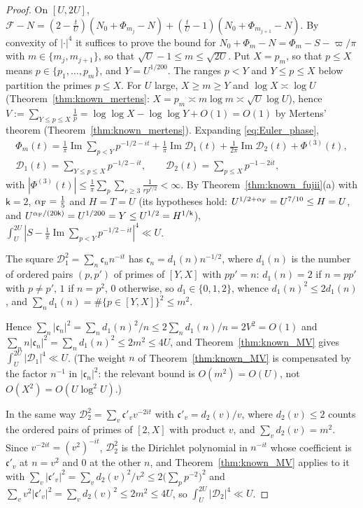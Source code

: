 \documentclass[11pt,a4paper]{article}
\makeatletter
\numberwithin{equation}{section}
\DeclareRobustCommand{\CGref}[1]{\ref{#1}}
\DeclareRobustCommand{\CGeqref}[1]{\eqref{#1}}
\let\CG@origref\ref
\let\CG@origeqref\eqref
\newcommand{\CG@gettip}[1]{\@ifundefined{CGTip@#1}{#1}{\csname CGTip@#1\endcsname}}
\DeclareRobustCommand{\CGref}[1]{\pdftooltip{\CG@origref{#1}}{\CG@gettip{#1}}}
\DeclareRobustCommand{\CGeqref}[1]{\pdftooltip{\CG@origeqref{#1}}{\CG@gettip{#1}}}
\theoremstyle{definition}
\theoremstyle{remark}
\newcommand{\Nz}{N_0} %
\newcommand{\Fc}{\mathcal F}
\newcommand{\Ph}{\Phi}
\makeatother
\begin{document}
\begin{proof}
On $[U,2U]$, $\Fc-N=(2-\frac tU)(\Nz+\Ph_{m_j}-N)+(\frac tU-1)(\Nz+\Ph_{m_{j+1}}-N)$. By convexity of $|\cdot|^4$ it suffices to prove the bound for $\Nz+\Ph_m-N=\Ph_m-S-\varpi/\pi$ with $m\in\{m_j,m_{j+1}\}$, so that $\sqrt U-1\le m\le\sqrt{2U}$. Put $X=p_m$, so that $p\le X$ means $p\in\{p_1,\dots,p_m\}$, and $Y=U^{1/200}$. The ranges $p<Y$ and $Y\le p\le X$ below partition the primes $p\le X$. For $U$ large, $X\ge m\ge Y$ and $\log X\asymp\log U$ (Theorem~\CGref{thm:known_mertens}: $X=p_m\asymp m\log m\asymp\sqrt U\log U$), hence $V:=\sum_{Y\le p\le X}\frac1p=\log\log X-\log\log Y+O(1)=O(1)$ by Mertens' theorem (Theorem~\CGref{thm:known_mertens}). Expanding \CGeqref{eq:Euler_phase},
\begin{equation}
\begin{gathered}
\Ph_m(t)=\frac1\pi\operatorname{Im}\sum_{p<Y}p^{-1/2-it}+\frac1\pi\operatorname{Im}\mathscr D_1(t)+\frac1{2\pi}\operatorname{Im}\mathscr D_2(t)+\Ph^{(3)}(t),\\
\mathscr D_1(t)=\sum_{Y\le p\le X}p^{-1/2-it},\qquad \mathscr D_2(t)=\sum_{p\le X}p^{-1-2it},
\end{gathered}
\label{eq:phase_split}
\end{equation}
with $|\Ph^{(3)}(t)|\le\frac1\pi\sum_p\sum_{r\ge3}\frac1{rp^{r/2}}<\infty$. By Theorem~\CGref{thm:known_fujii}(a) with $\mathsf k=2$, $\alpha_{\rm F}=\frac15$ and $H=T=U$ (its hypotheses hold: $U^{1/2+\alpha_{\rm F}}=U^{7/10}\le H=U$, and $U^{\alpha_{\rm F}/(20\mathsf k)}=U^{1/200}=Y\le U^{1/2}=H^{1/\mathsf k}$), $\int_U^{2U}|S-\frac1\pi\operatorname{Im}\sum_{p<Y}p^{-1/2-it}|^4\ll U$.

The square $\mathscr D_1^2=\sum_n\mathfrak c_nn^{-it}$ has $\mathfrak c_n=d_1(n)n^{-1/2}$, where $d_1(n)$ is the number of ordered pairs $(p,p')$ of primes of $[Y,X]$ with $pp'=n$: $d_1(n)=2$ if $n=pp'$ with $p\ne p'$, $1$ if $n=p^2$, $0$ otherwise, so $d_1\in\{0,1,2\}$, whence $d_1(n)^2\le2d_1(n)$, and $\sum_nd_1(n)=\#\{p\in[Y,X]\}^2\le m^2$.

Hence $\sum_n|\mathfrak c_n|^2=\sum_nd_1(n)^2/n\le2\sum_nd_1(n)/n=2V^2=O(1)$ and $\sum_nn|\mathfrak c_n|^2=\sum_nd_1(n)^2\le2m^2\le4U$, and Theorem~\CGref{thm:known_MV} gives $\int_U^{2U}|\mathscr D_1|^4\ll U$. (The weight $n$ of Theorem~\CGref{thm:known_MV} is compensated by the factor $n^{-1}$ in $|\mathfrak c_n|^2$: the relevant bound is $O(m^2)=O(U)$, not $O(X^2)=O(U\log^2U)$.)

In the same way $\mathscr D_2^2=\sum_v\mathfrak c'_vv^{-2it}$ with $\mathfrak c'_v=d_2(v)/v$, where $d_2(v)\le2$ counts the ordered pairs of primes of $[2,X]$ with product $v$, and $\sum_vd_2(v)=m^2$. Since $v^{-2it}=(v^2)^{-it}$, $\mathscr D_2^2$ is the Dirichlet polynomial in $n^{-it}$ whose coefficient is $\mathfrak c'_v$ at $n=v^2$ and $0$ at the other $n$, and Theorem~\CGref{thm:known_MV} applies to it with $\sum_v|\mathfrak c'_v|^2=\sum_vd_2(v)^2/v^2\le2\bigl(\sum_pp^{-2}\bigr)^2$ and $\sum_vv^2|\mathfrak c'_v|^2=\sum_vd_2(v)^2\le2m^2\le4U$, so $\int_U^{2U}|\mathscr D_2|^4\ll U$.


\end{proof}
\end{document}
